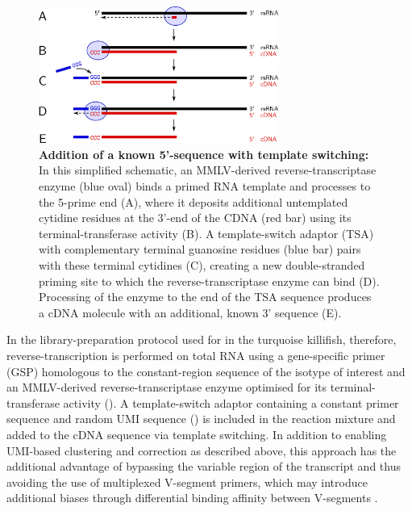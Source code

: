 \begin{figure}
\centering
\includegraphics[width=0.7\textwidth]{_Figures/png_edited/template-switch-labelled}
\vspace{0.5em}
\caption{\textbf{Addition of a known 5'-sequence with template switching:} In this simplified schematic, an MMLV-derived reverse-transcriptase enzyme (blue oval) binds a primed RNA template and processes to the 5-prime end (A), where it deposits additional untemplated cytidine residues at the 3'-end of the CDNA (red bar) using its terminal-transferase activity (B). A template-switch adaptor (TSA) with complementary terminal guanosine residues (blue bar) pairs with these terminal cytidines (C), creating a new double-stranded priming site to which the reverse-transcriptase enzyme can bind (D). Processing of the enzyme to the end of the TSA sequence produces a cDNA molecule with an additional, known 3' sequence (E).}
\label{fig:template-switch-schema}
\end{figure}

In the library-preparation protocol used for \Igseq in the turquoise killifish, therefore, reverse-transcription is performed on total RNA using a gene-specific primer (GSP) homologous to the constant-region sequence of the isotype of interest and an MMLV-derived reverse-transcriptase enzyme optimised for its terminal-transferase activity (). A template-switch adaptor containing a constant primer sequence and random UMI sequence () is included in the reaction mixture and added to the cDNA sequence via template switching. In addition to enabling UMI-based clustering and correction as described above, this approach has the additional advantage of bypassing the variable region of the \igh{} transcript and thus avoiding the use of multiplexed V-segment primers, which may introduce additional biases through differential binding affinity between V-segments \parencite{rosati2017methods}.

